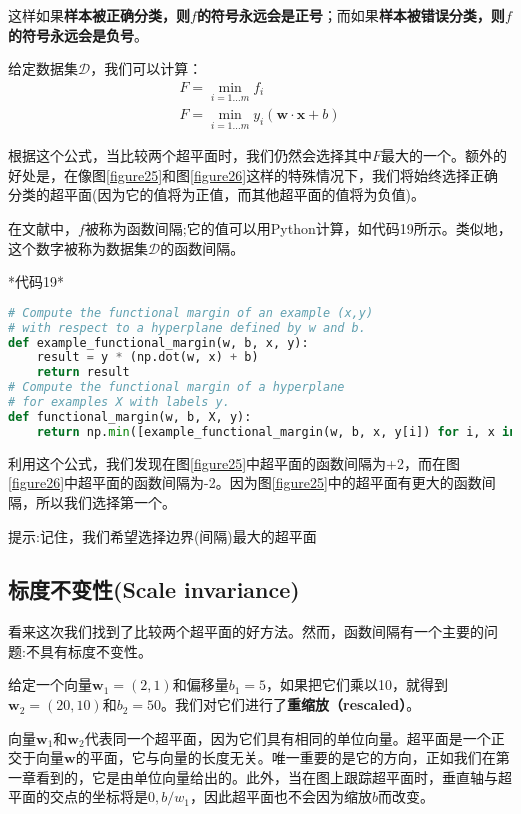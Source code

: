 这样如果\textbf{样本被正确分类，则$f$的符号永远会是正号}；而如果\textbf{样本被错误分类，则$f$的符号永远会是负号}。

给定数据集$\mathcal{D}$，我们可以计算：
\begin{gather*}
F = \min_{i=1\dots m}f_i \\
F = \min_{i=1\dots m}y_i (\mathbf{w}\cdot\mathbf{x}+b)
\end{gather*}

根据这个公式，当比较两个超平面时，我们仍然会选择其中$F$最大的一个。额外的好处是，在像图\ref{figure25}和图\ref{figure26}这样的特殊情况下，我们将始终选择正确分类的超平面(因为它的值将为正值，而其他超平面的值将为负值)。


在文献中，$f$被称为函数间隔;它的值可以用Python计算，如代码19所示。类似地，这个数字被称为数据集$\mathcal{D}$的函数间隔。

*代码19*

\begin{lstlisting}[language=python]
# Compute the functional margin of an example (x,y) 
# with respect to a hyperplane defined by w and b. 
def example_functional_margin(w, b, x, y): 
    result = y * (np.dot(w, x) + b) 
    return result 
# Compute the functional margin of a hyperplane 
# for examples X with labels y. 
def functional_margin(w, b, X, y): 
    return np.min([example_functional_margin(w, b, x, y[i]) for i, x in enumerate(X)])
\end{lstlisting}

利用这个公式，我们发现在图\ref{figure25}中超平面的函数间隔为+2，而在图\ref{figure26}中超平面的函数间隔为-2。因为图\ref{figure25}中的超平面有更大的函数间隔，所以我们选择第一个。

提示:记住，我们希望选择边界(间隔)最大的超平面


\subsection{标度不变性(Scale invariance)}

看来这次我们找到了比较两个超平面的好方法。然而，函数间隔有一个主要的问题:不具有标度不变性。

给定一个向量$\mathbf{w}_1=(2,1)$和偏移量$b_1=5$，如果把它们乘以10，就得到$\mathbf{w}_2=(20,10)$和$b_2=50$。我们对它们进行了\textbf{重缩放（rescaled）}。

向量$\mathbf{w}_1$和$\mathbf{w}_2$代表同一个超平面，因为它们具有相同的单位向量。超平面是一个正交于向量$\mathbf{w}$的平面，它与向量的长度无关。唯一重要的是它的方向，正如我们在第一章看到的，它是由单位向量给出的。此外，当在图上跟踪超平面时，垂直轴与超平面的交点的坐标将是$0,b/w_1$，因此超平面也不会因为缩放$b$而改变。

